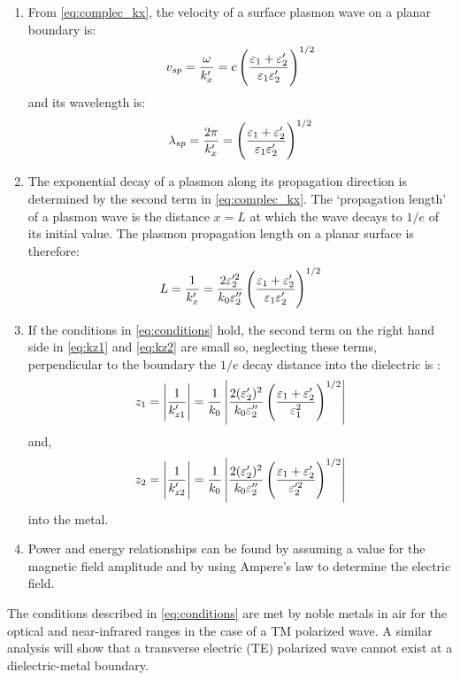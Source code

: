 \documentclass[11pt]{article}
\begin{document}
\begin{enumerate}
  \item	From \eqref{eq:complec_kx}, the velocity of a surface plasmon wave on a planar boundary is:
  \begin{equation}
    v_{sp} = \frac{\omega}{k_x'} = c \left( \frac{\varepsilon_1 + \varepsilon_2'}{\varepsilon_1 \varepsilon_2'} \right)^{1/2}
    \label{eq:velocity}
  \end{equation}
  and its wavelength is:
  \begin{equation}
    \lambda_{sp} = \frac{2 \pi}{k_x'} = \left( \frac{\varepsilon_1 + \varepsilon_2'}{\varepsilon_1 \varepsilon_2'} \right)^{1/2}
    \label{eq:wavelength}
  \end{equation}
  \item	The exponential decay of a plasmon along its propagation direction is determined by the second term in \eqref{eq:complec_kx}. The `propagation length' of a plasmon wave is the distance $x = L$ at which the wave decays to   $1/e$ of its initial value. The plasmon propagation length on a planar surface is therefore:
  \begin{equation}
    L = \frac{1}{k_x'} = \frac{2 \varepsilon_2'^2}{k_0 \varepsilon_2''} \left( \frac{\varepsilon_1 + \varepsilon_2'}{\varepsilon_1 \varepsilon_2'} \right)^{1/2}
    \label{eq:plength}
  \end{equation}
  \item	If the conditions in \eqref{eq:conditions} hold, the second term on the right hand side in \eqref{eq:kz1} and \eqref{eq:kz2} are small so, neglecting these terms, perpendicular to the boundary the $1/e$ decay distance into the dielectric is \cite{Raether1988}:
  \begin{equation}
    z_1 = \left| \frac{1}{k_{z1}'} \right| = \frac{1}{k_0} \left| \frac{2 (\varepsilon_2')^2}{k_0 \varepsilon_2''} \left( \frac{\varepsilon_1 + \varepsilon_2'}{\varepsilon_1^2} \right)^{1/2} \right|
    \label{eq:decay_dielectric}
  \end{equation}
  and,
  \begin{equation}
    z_2 = \left| \frac{1}{k_{z2}'} \right| = \frac{1}{k_0} \left| \frac{2 (\varepsilon_2')^2}{k_0 \varepsilon_2''} \left( \frac{\varepsilon_1 + \varepsilon_2'}{\varepsilon_2'^2} \right)^{1/2} \right|
    \label{eq:decay_metal}
  \end{equation}
  into the metal.
  \item	Power and energy relationships can be found by assuming a value for the magnetic field amplitude and by using Ampere's law to determine the electric field.
\end{enumerate}
%

The conditions described in \eqref{eq:conditions} are met by noble metals in air for the optical and near-infrared ranges in the case of a TM polarized wave. A similar analysis will show that a transverse electric (TE) polarized wave cannot exist at a dielectric-metal boundary.
\end{document}
